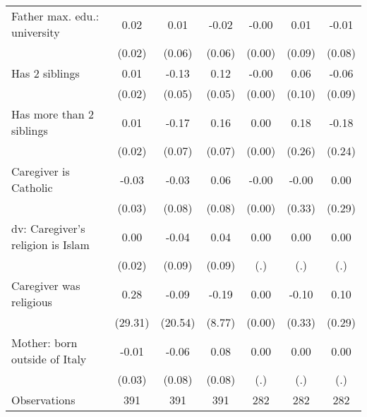 {\begin{tabular}{l*{6}{c}}
\addlinespace
Father max. edu.: university&        0.02         &        0.01         &       -0.02         &       -0.00         &        0.01         &       -0.01         \\
                    &      (0.02)         &      (0.06)         &      (0.06)         &      (0.00)         &      (0.09)         &      (0.08)         \\
\addlinespace
Has 2 siblings      &        0.01         &       -0.13\sym{*}  &        0.12\sym{*}  &       -0.00         &        0.06         &       -0.06         \\
                    &      (0.02)         &      (0.05)         &      (0.05)         &      (0.00)         &      (0.10)         &      (0.09)         \\
\addlinespace
Has more than 2 siblings&        0.01         &       -0.17\sym{*}  &        0.16\sym{*}  &        0.00         &        0.18         &       -0.18         \\
                    &      (0.02)         &      (0.07)         &      (0.07)         &      (0.00)         &      (0.26)         &      (0.24)         \\
\addlinespace
Caregiver is Catholic&       -0.03         &       -0.03         &        0.06         &       -0.00         &       -0.00         &        0.00         \\
                    &      (0.03)         &      (0.08)         &      (0.08)         &      (0.00)         &      (0.33)         &      (0.29)         \\
\addlinespace
dv: Caregiver's religion is Islam&        0.00         &       -0.04         &        0.04         &        0.00         &        0.00         &        0.00         \\
                    &      (0.02)         &      (0.09)         &      (0.09)         &         (.)         &         (.)         &         (.)         \\
\addlinespace
Caregiver was religious&        0.28         &       -0.09         &       -0.19         &        0.00         &       -0.10         &        0.10         \\
                    &     (29.31)         &     (20.54)         &      (8.77)         &      (0.00)         &      (0.33)         &      (0.29)         \\
\addlinespace
Mother: born outside of Italy&       -0.01         &       -0.06         &        0.08         &        0.00         &        0.00         &        0.00         \\
                    &      (0.03)         &      (0.08)         &      (0.08)         &         (.)         &         (.)         &         (.)         \\
\midrule
Observations        &         391         &         391         &         391         &         282         &         282         &         282         \\
\bottomrule
\end{tabular}
}
